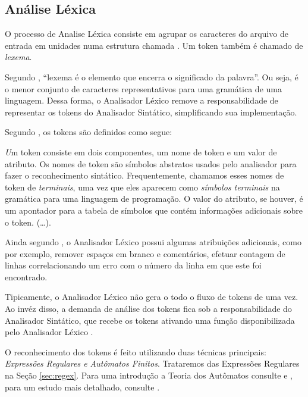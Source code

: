\subsection{Análise Léxica}

O processo de Analise Léxica consiste em agrupar os caracteres do arquivo de
entrada em unidades numa estrutura chamada \token. Um token também é chamado
de \emph{lexema}.

Segundo , ``lexema é o elemento que encerra o
significado da palavra''. Ou seja, é o menor conjunto de caracteres
representativos para uma gramática de uma linguagem. Dessa forma, o Analisador
Léxico remove a responsabilidade de representar os tokens do Analisador
Sintático, simplificando sua implementação.

Segundo , os tokens são definidos como segue:

\begin{citacao}{4cm}{0cm}\footnotesize \emph
	Um token consiste em dois componentes, um nome de token e um valor de
	atributo. Os nomes de token são símbolos abstratos usados pelo analisador para
	fazer o reconhecimento sintático. Frequentemente, chamamos esses nomes de
	token de \emph{terminais}, uma vez que eles aparecem como \emph{símbolos
	terminais} na gramática para uma linguagem de programação. O valor do
	atributo, se houver, é um apontador para a tabela de símbolos que contém
	informações adicionais sobre o token. (\ldots).
\end{citacao}

Ainda segundo , o Analisador Léxico possui algumas
atribuições adicionais, como por exemplo, remover espaços em branco e
comentários, efetuar contagem de linhas correlacionando um erro com o número
da linha em que este foi encontrado.

Tipicamente, o Analisador Léxico não gera o todo o fluxo de tokens de uma vez.
Ao invéz disso, a demanda de análise dos tokens fica sob a responsabilidade do
Analisador Sintático, que recebe os tokens ativando uma função disponibilizada
pelo Analisador Léxico \cite{louden97-pt}.

O reconhecimento dos tokens é feito utilizando duas técnicas principais:
\emph{Expressões Regulares e Autômatos Finitos}. Trataremos das Expressões
Regulares na Seção \ref{sec:regex}. Para uma introdução a Teoria dos Autômatos
consulte  e  , para um estudo
mais detalhado, consulte .

